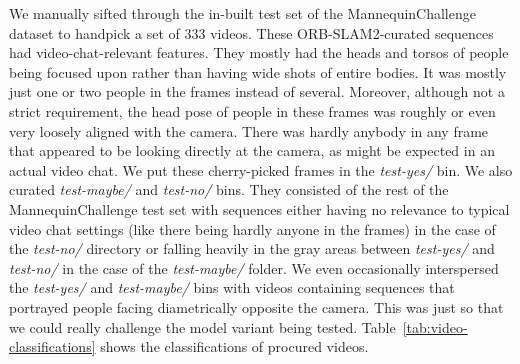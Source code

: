 We manually sifted through the in-built test set of the MannequinChallenge dataset to handpick a set of 333 videos. These ORB-SLAM2-curated sequences had video-chat-relevant features. They mostly had the heads and torsos of people being focused upon rather than having wide shots of entire bodies. It was mostly just one or two people in the frames instead of several. Moreover, although not a strict requirement, the head pose of people in these frames was roughly or even very loosely aligned with the camera. There was hardly anybody in any frame that appeared to be looking directly at the camera, as might be expected in an actual video chat. We put these cherry-picked frames in the \textit{test-yes/} bin. We also curated \textit{test-maybe/} and \textit{test-no/} bins. They consisted of the rest of the MannequinChallenge test set with sequences either having no relevance to typical video chat settings (like there being hardly anyone in the frames) in the case of the \textit{test-no/} directory or falling heavily in the gray areas between \textit{test-yes/} and \textit{test-no/} in the case of the \textit{test-maybe/} folder. We even occasionally interspersed the \textit{test-yes/} and \textit{test-maybe/} bins with videos containing sequences that portrayed people facing diametrically opposite the camera. This was just so that we could really challenge the model variant being tested. Table~\ref{tab:video-classifications} shows the classifications of procured videos.



